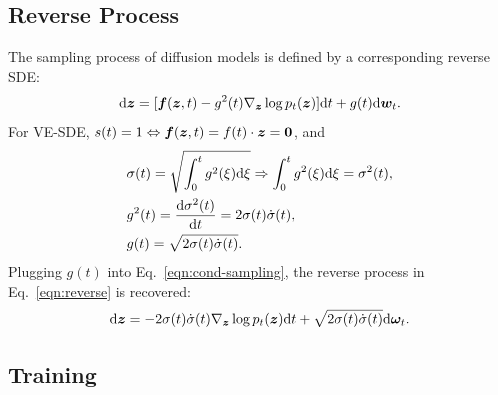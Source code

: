 \subsection{Reverse Process}
The sampling process of diffusion models is defined by a corresponding reverse SDE:
\begin{equation}\label{eqn:cond-sampling}
    {\rm d} {\bm{z}}  = [{\bm{f}}({\bm{z}}, t) - g^2(t) \nabla_{{\bm{z}}}\log p_t({\bm{z}})] {\rm d}t  + g(t) {\rm d} {\bm{w}}_t.
\end{equation}
For VE-SDE, $s(t) = 1 \Leftrightarrow {\bm{f}}({\bm{z}}, t) = f(t)\cdot {\bm{z}} = \bm{0}$, and 
\begin{equation}
\begin{split}
    & \sigma(t)  = \sqrt{\int_0^t g^2(\xi) {\rm d} \xi} \Rightarrow \int_0^t g^2(\xi) {\rm d} \xi = \sigma^2(t),  \\
    & g^2(t) = \frac{{\rm d} \sigma^2(t) }{ {\rm d} t} = 2\sigma(t)\dot{\sigma}(t), \\
    & g(t) = \sqrt{2\sigma(t) \dot{\sigma}(t)}.
\end{split}
\end{equation}
Plugging $g(t)$ into Eq.~\ref{eqn:cond-sampling}, the reverse process in Eq.~\ref{eqn:reverse} is recovered:
\begin{equation}
    {\rm d}{\bm{z}} = -2\sigma(t)\dot{\sigma}(t)\nabla_{{\bm{z}}} \log p_t({\bm{z}}) {\rm d}t + \sqrt{2\sigma(t) \dot{\sigma}(t)} {\rm d} \bm{\omega}_t.
\end{equation}

\subsection{Training}

